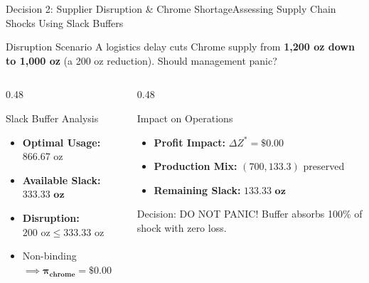 \documentclass{beamer}
\begin{document}
\begin{frame}{Decision 2: Supplier Disruption \& Chrome Shortage}{Assessing Supply Chain Shocks Using Slack Buffers}
    \begin{block}{Disruption Scenario}
        \small
        A logistics delay cuts Chrome supply from \textbf{1,200 oz down to 1,000 oz} (a 200 oz reduction). Should management panic?
    \end{block}
    \vspace{-0.2em}
    \begin{columns}[T]
        \begin{column}{0.48\textwidth}
            \begin{block}{Slack Buffer Analysis}
                \begin{itemize}\setlength{\itemsep}{0.1em}
                    \item \textbf{Optimal Usage:} 866.67 oz
                    \item \textbf{Available Slack:} $\mathbf{333.33\text{ oz}}$
                    \item \textbf{Disruption:} $200\text{ oz} \le 333.33\text{ oz}$
                    \item Non-binding $\implies \mathbf{\pi_{\text{chrome}} = \$0.00}$
                \end{itemize}
            \end{block}
        \end{column}
        \begin{column}{0.48\textwidth}
            \begin{exampleblock}{Impact on Operations}
                \begin{itemize}\setlength{\itemsep}{0.1em}
                    \item \textbf{Profit Impact:} $\Delta Z^* = \mathbf{\$0.00}$
                    \item \textbf{Production Mix:} $(700, 133.3)$ preserved
                    \item \textbf{Remaining Slack:} $\mathbf{133.33\text{ oz}}$
                \end{itemize}
            \end{exampleblock}
            \vspace{-0.2em}
            \begin{alertblock}{Decision: DO NOT PANIC!}
                \centering \small Buffer absorbs 100\% of shock with zero loss.
            \end{alertblock}
        \end{column}
    \end{columns}
\end{frame}
\end{document}
